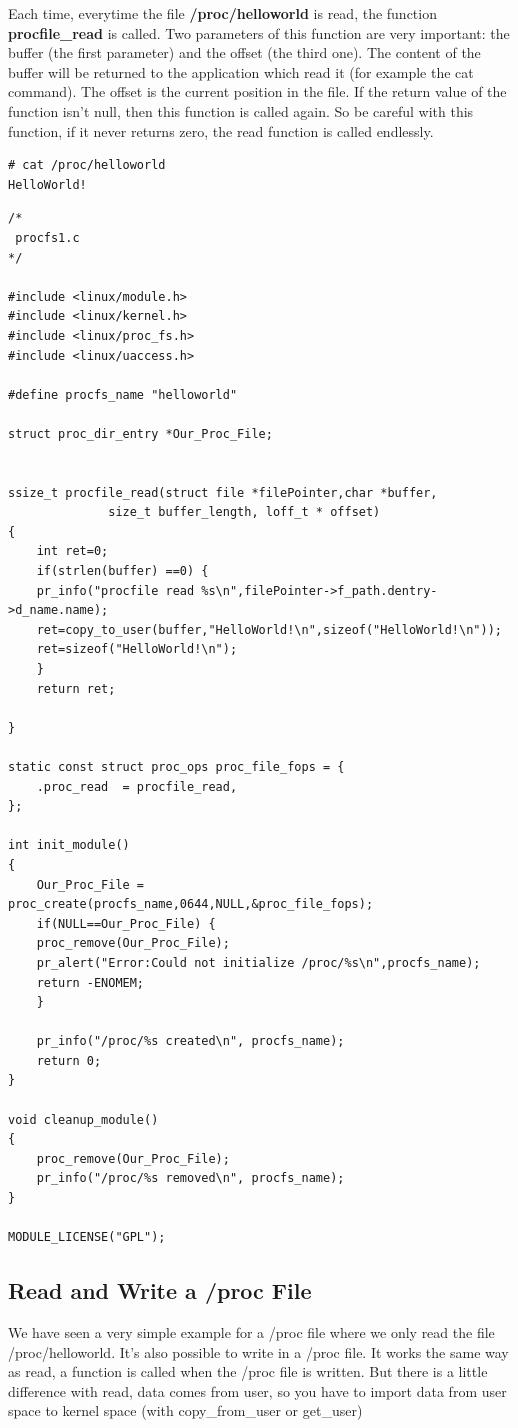 \documentclass[11pt]{article}
\begin{document}
Each time, everytime the file \textbf{/proc/helloworld} is read, the function \textbf{procfile\_read} is called. Two parameters of this function are very important: the buffer (the first parameter) and the offset (the third one). The content of the buffer will be returned to the application which read it (for example the cat command). The offset is the current position in the file. If the return value of the function isn't null, then this function is called again. So be careful with this function, if it never returns zero, the read function is called endlessly.

\begin{verbatim}
# cat /proc/helloworld
HelloWorld!
\end{verbatim}

\begin{verbatim}
/*
 procfs1.c
*/

#include <linux/module.h>
#include <linux/kernel.h>
#include <linux/proc_fs.h>
#include <linux/uaccess.h>

#define procfs_name "helloworld"

struct proc_dir_entry *Our_Proc_File;


ssize_t procfile_read(struct file *filePointer,char *buffer,
		      size_t buffer_length, loff_t * offset)
{
    int ret=0;
    if(strlen(buffer) ==0) {
	pr_info("procfile read %s\n",filePointer->f_path.dentry->d_name.name);
	ret=copy_to_user(buffer,"HelloWorld!\n",sizeof("HelloWorld!\n"));
	ret=sizeof("HelloWorld!\n");
    }
    return ret;

}

static const struct proc_ops proc_file_fops = {
    .proc_read  = procfile_read,
};

int init_module()
{
    Our_Proc_File = proc_create(procfs_name,0644,NULL,&proc_file_fops);
    if(NULL==Our_Proc_File) {
	proc_remove(Our_Proc_File);
	pr_alert("Error:Could not initialize /proc/%s\n",procfs_name);
	return -ENOMEM;
    }

    pr_info("/proc/%s created\n", procfs_name);
    return 0;
}

void cleanup_module()
{
    proc_remove(Our_Proc_File);
    pr_info("/proc/%s removed\n", procfs_name);
}

MODULE_LICENSE("GPL");
\end{verbatim}

\subsection{Read and Write a /proc File}
\label{sec:org6ba52b3}
We have seen a very simple example for a /proc file where we only read the file /proc/helloworld. It's also possible to write in a /proc file. It works the same way as read, a function is called when the /proc file is written. But there is a little difference with read, data comes from user, so you have to import data from user space to kernel space (with copy\_from\_user or get\_user)
\end{document}
